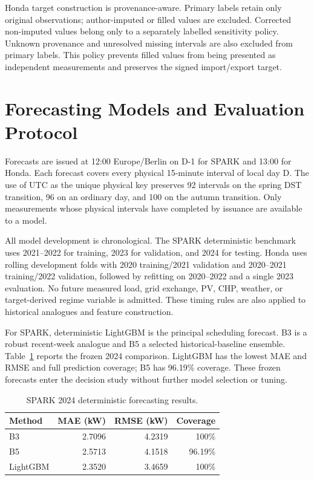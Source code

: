 \documentclass[10pt,twocolumn]{article}
\begin{document}
Honda target construction is provenance-aware. Primary labels retain only
original observations; author-imputed or filled values are excluded. Corrected
non-imputed values belong only to a separately labelled sensitivity policy.
Unknown provenance and unresolved missing intervals are also excluded from
primary labels. This policy prevents filled values from being presented as
independent measurements and preserves the signed import/export target.

\section{Forecasting Models and Evaluation Protocol}
\label{sec:forecasting}

Forecasts are issued at 12:00 Europe/Berlin on D-1 for SPARK and 13:00 for
Honda. Each forecast covers every physical 15-minute interval of local day D.
The use of UTC as the unique physical key preserves 92 intervals on the spring
DST transition, 96 on an ordinary day, and 100 on the autumn transition. Only
measurements whose physical intervals have completed by issuance are available
to a model.

All model development is chronological. The SPARK deterministic benchmark
uses 2021--2022 for training, 2023 for validation, and 2024 for testing. Honda
uses rolling development folds with 2020 training/2021 validation and
2020--2021 training/2022 validation, followed by refitting on 2020--2022 and a
single 2023 evaluation. No future measured load, grid exchange, PV, CHP,
weather, or target-derived regime variable is admitted. These timing rules are
also applied to historical analogues and feature construction.

For SPARK, deterministic LightGBM is the principal scheduling forecast. B3 is
a robust recent-week analogue and B5 a selected historical-baseline ensemble.
Table~\ref{tab:spark-forecast} reports the frozen 2024 comparison. LightGBM has
the lowest MAE and RMSE and full prediction coverage; B5 has 96.19\% coverage.
These frozen forecasts enter the decision study without further model selection
or tuning.

\begin{table}[t]
\centering
\caption{SPARK 2024 deterministic forecasting results.}
\label{tab:spark-forecast}
\small
\begin{tabular}{lrrr}
\toprule
Method & MAE (kW) & RMSE (kW) & Coverage\\
\midrule
B3 & 2.7096 & 4.2319 & 100\%\\
B5 & 2.5713 & 4.1518 & 96.19\%\\
LightGBM & 2.3520 & 3.4659 & 100\%\\
\bottomrule
\end{tabular}
\end{table}
\end{document}
